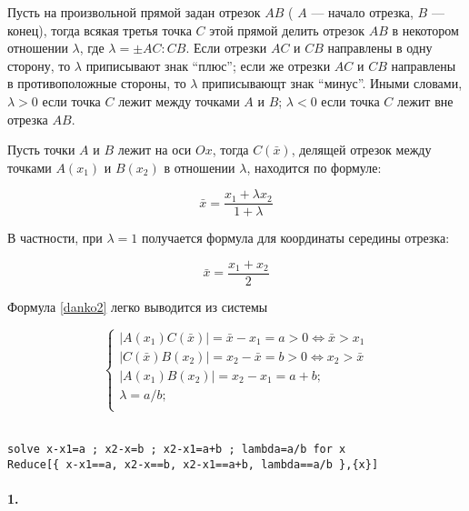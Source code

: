 Пусть на произвольной прямой задан отрезок $AB$ ( $A$ --- начало отрезка, $B$
--- конец), тогда всякая третья точка $C$ этой прямой делить отрезок $AB$ в
некотором отношении $\lambda$, где $\lambda= \pm AC:CB$. Если отрезки $AC$ и
$CB$ направлены в одну сторону, то $\lambda$ приписывают знак ``плюс''; если же
отрезки $AC$ и $CB$ направлены в противоположные стороны, то $\lambda$
приписывающт знак ``минус''. Иными словами, $\lambda>0$ если точка $C$ лежит
между точками $A$ и $B$; $\lambda < 0$ если точка $C$ лежит вне отрезка $AB$.

Пусть точки $A$ и $B$ лежит на оси $Ox$, тогда  $C(\bar{x})$, делящей отрезок между точками $A(x_1)$ и
$B(x_2)$ в отношении $\lambda$, находится по формуле:

\begin{equation}\label{danko2}
\bar x=\frac{x_1+\lambda x_2}{1+\lambda}
\end{equation}

В частности, при $\lambda=1$ получается формула для координаты середины отрезка:

\begin{equation}\label{danko3}
\bar x = \frac{x_1+x_2}{2}
\end{equation}

Формула \ref{danko2} легко выводится из системы

\begin{equation*}
\begin{cases}
|A(x_1)C(\bar x)| = \bar x - x_1 = a >0 \Leftrightarrow \bar x > x_1\\
|C(\bar x)B(x_2)| = x_2 - \bar x = b >0 \Leftrightarrow x_2 > \bar x\\
|A(x_1)B(x_2)| = x_2 - x_1 = a+b;\\
\lambda = a/b;\\ 
\end{cases}
\end{equation*}

\wolfram\\
\verb|solve x-x1=a ; x2-x=b ; x2-x1=a+b ; lambda=a/b for x|\\
\verb|Reduce[{ x-x1==a, x2-x==b, x2-x1==a+b, lambda==a/b },{x}]|


\paragraph{1.}

